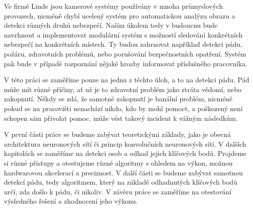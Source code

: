 Ve firmě Linde jsou kamerové systémy používány v mnoha průmyslových provozech,
nicméně chybí ucelený systém pro automatickou analýzu obrazu a detekci různých
druhů nebezpečí. Naším úkolem tedy v budoucnu bude navrhnout a implementovat
modulární systém s možností sledování konkrétních nebezpečí na konkrétních
místech. Ty budou zahrnovat například detekci pádu, požáru, zdravotních
problémů, nebo porušování bezpečnostních opatření. Systém pak bude v případě
rozpoznání nějaké hrozby informovat příslušného pracovníka.

V této práci se zaměříme pouze na jednu z těchto úloh, a to na detekci pádu.
Pád může mít různé příčiny, ať už je to zdravotní problém jako ztráta vědomí,
nebo zakopnutí. Někdy se zdá, že samotné zakopnutí je banální problém, nicméně
pokud se na pracovišti nenachází nikdo, kdo by mohl pomoct, a poškozený není
schopen sám přivolat pomoc, může vést takový incident k vážným následkům.

V první části práce se budeme zabývat teoretickými základy, jako je obecná
architektura neuronových sítí či princip konvolučních neuronových sítí. V
dalších kapitolách se zaměříme na detekci osob a odhad jejich klíčových bodů.
Projdeme si různé přístupy a otestujeme různé algoritmy s ohledem na výkon,
možnou hardwarovou akcelerací a preciznost. V další části se budeme zabývat
samotnou detekcí pádu, tedy algoritmem, který na základě odhadnutých klíčových
bodů určí, zda došlo k pádu, či nikoliv. V závěru práce se zaměříme na
otestování výsledného řešení a zhodnocení jeho výkonu.

\endinput